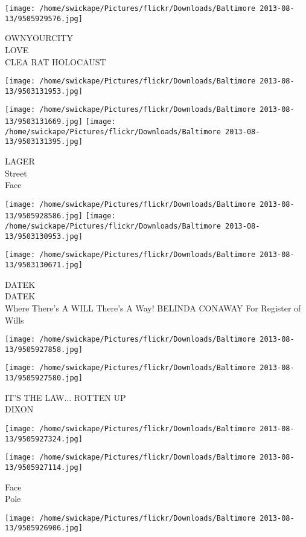 \documentclass[10pt,letterpaper]{article}
\begin{document}
\texttt{[image: /home/swickape/Pictures/flickr/Downloads/Baltimore 2013-08-13/9505929576.jpg]}

OWNYOURCITY\\
LOVE\\
CLEA RAT HOLOCAUST
\pagebreak

\texttt{[image: /home/swickape/Pictures/flickr/Downloads/Baltimore 2013-08-13/9503131953.jpg]}

\vspace{0.25in}
\texttt{[image: /home/swickape/Pictures/flickr/Downloads/Baltimore 2013-08-13/9503131669.jpg]}
\texttt{[image: /home/swickape/Pictures/flickr/Downloads/Baltimore 2013-08-13/9503131395.jpg]}

LAGER\\
Street\\
Face
\pagebreak

\texttt{[image: /home/swickape/Pictures/flickr/Downloads/Baltimore 2013-08-13/9505928586.jpg]}
\texttt{[image: /home/swickape/Pictures/flickr/Downloads/Baltimore 2013-08-13/9503130953.jpg]}

\texttt{[image: /home/swickape/Pictures/flickr/Downloads/Baltimore 2013-08-13/9503130671.jpg]}

DATEK\\
DATEK\\
Where There's A WILL There's A Way!  BELINDA CONAWAY For Register of Wills
\pagebreak

\texttt{[image: /home/swickape/Pictures/flickr/Downloads/Baltimore 2013-08-13/9505927858.jpg]}

\vspace{0.25in}
\texttt{[image: /home/swickape/Pictures/flickr/Downloads/Baltimore 2013-08-13/9505927580.jpg]}

IT'S THE LAW... ROTTEN UP\\
DIXON
\pagebreak

\texttt{[image: /home/swickape/Pictures/flickr/Downloads/Baltimore 2013-08-13/9505927324.jpg]}

\vspace{0.25in}
\texttt{[image: /home/swickape/Pictures/flickr/Downloads/Baltimore 2013-08-13/9505927114.jpg]}

Face\\
Pole
\pagebreak

\texttt{[image: /home/swickape/Pictures/flickr/Downloads/Baltimore 2013-08-13/9505926906.jpg]}
\end{document}
